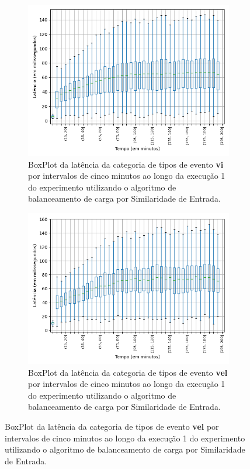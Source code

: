 \begin{figure}
\begin{subfigure}{.5\textwidth}
\centering
\includegraphics[width=\textwidth]{figuras/graphics/boxplot_6-dez-is_vi.png}
\caption{BoxPlot da latência da categoria de tipos de evento \textbf{vi} por intervalos de cinco minutos ao longo da execução 1 do experimento utilizando o algoritmo de balanceamento de carga por Similaridade de Entrada.}
\label{fig:BoxPlot_vi_IS_1}
\end{subfigure}%
\centering
\begin{subfigure}{.5\textwidth}
\centering
\includegraphics[width=\textwidth]{figuras/graphics/boxplot_6-dez-is_vel.png}
\caption{BoxPlot da latência da categoria de tipos de evento \textbf{vel} por intervalos de cinco minutos ao longo da execução 1 do experimento utilizando o algoritmo de balanceamento de carga por Similaridade de Entrada.}
\label{fig:BoxPlot_vel_IS_1}
\end{subfigure}%


\end{figure}
